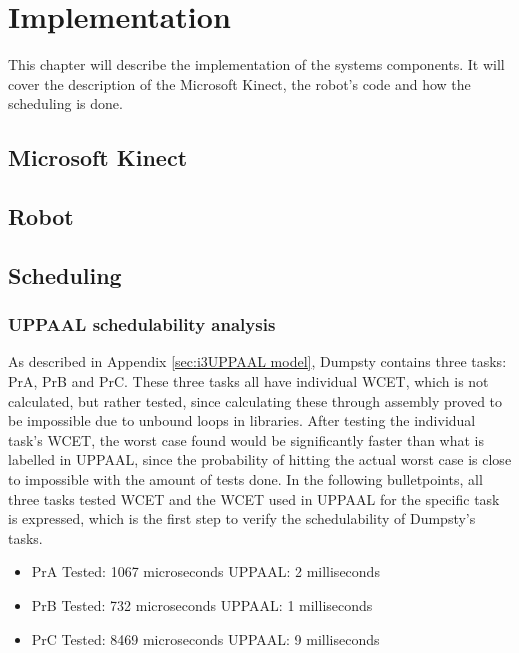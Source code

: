 \chapter{Implementation}
\label{chap:Implementation}
This chapter will describe the implementation of the systems components. It will cover the description of the Microsoft Kinect, the robot's code and how the scheduling is done. 

\section{Microsoft Kinect}
\label{sec:Microsoft Kinect Implementation}

\section{Robot}
\label{sec:Robot}

\section{Scheduling}
\label{sec:Scheduling implementation}

\subsection{UPPAAL schedulability analysis}
\label{sec:UPPAAL schedulability}
As described in Appendix \ref{sec:i3UPPAAL model}, Dumpsty contains three tasks: PrA, PrB and PrC. These three tasks all have individual WCET, which is not calculated, but rather tested, since calculating these through assembly proved to be impossible due to unbound loops in libraries. After testing the individual task's WCET, the worst case found would be significantly faster than what is labelled in UPPAAL, since the probability of hitting the actual worst case is close to impossible with the amount of tests done. In the following bulletpoints, all three tasks tested WCET and the WCET used in UPPAAL for the specific task is expressed, which is the first step to verify the schedulability of Dumpsty's tasks.

\begin{itemize}
	\item PrA \tab Tested: 1067 microseconds \tab UPPAAL: 2 milliseconds
	\item PrB \tab Tested: 732  microseconds \tab UPPAAL: 1 milliseconds
	\item PrC \tab	Tested: 8469 microseconds \tab UPPAAL: 9 milliseconds
\end{itemize}

